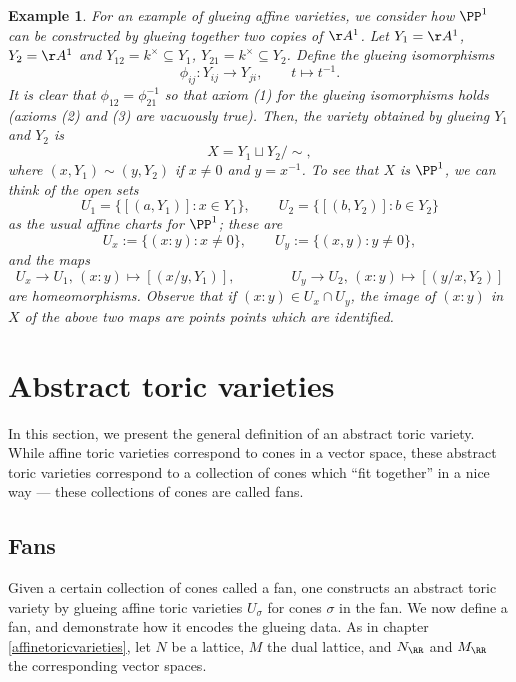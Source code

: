 \documentclass[12pt]{amsart}
\theoremstyle{plain}
\newtheorem{example}[theorem]{Example}
\begin{document}
\begin{example}
For an example of glueing affine varieties, we consider how $\PP^1$ can be constructed by glueing together two copies of $\AA^1$.
Let $Y_1=\AA^1$, $Y_2 = \AA^1$ and $Y_{12} = k^\times \subseteq Y_1$, $Y_{21} = k^\times \subseteq Y_2$.
Define the glueing isomorphisms
$$\phi_{ij} : Y_{ij} \to Y_{ji}, \qquad t \mapsto t^{-1}.$$
It is clear that $\phi_{12} = \phi_{21}^{-1}$ so that axiom (1) for the glueing isomorphisms holds (axioms (2) and (3) are vacuously true).
Then, the variety obtained by glueing $Y_1$ and $Y_2$ is
$$X = Y_1 \sqcup Y_2 / \sim,$$
where $(x, Y_1) \sim (y, Y_2)$ if $x \ne 0$ and $y = x^{-1}$.
To see that $X$ is $\PP^1$, we can  think of the open sets
$$U_1 = \{[(a, Y_1)] : x \in Y_1\}, \qquad U_2 = \{[(b, Y_2)] : b \in Y_2\}$$
as the usual affine charts for $\PP^1$;
these are
$$U_x := \{(x:y) : x \ne 0\}, \qquad U_y := \{(x, y) : y \ne 0\},$$
and the maps
$$U_x \to U_1, \, (x : y)\mapsto [(x/y, Y_1)], \qquad \qquad U_y \to U_2, \, (x : y)\mapsto [(y/x, Y_2)]$$
are homeomorphisms.
Observe that if $(x : y) \in U_x \cap U_y$, the image of $(x : y)$ in $X$ of the above two maps are points points which are identified.
\end{example}




\newpage
\section{Abstract toric varieties}
In this section, we present the general definition of an abstract toric variety.
While affine toric varieties correspond to cones in a vector space, these abstract toric varieties correspond to a collection of cones which ``fit together'' in a nice way --- these collections of cones are called fans.


\subsection{Fans}
Given a certain collection of cones called a fan, one constructs an abstract toric variety by glueing affine toric varieties $U_\sigma$ for cones $\sigma$ in the fan.
We now define a fan, and demonstrate how it encodes the glueing data.
As in chapter \ref{affinetoricvarieties}, let $N$ be a lattice, $M$ the dual lattice, and $N_\RR$ and $M_\RR$ the corresponding vector spaces.
\end{document}
